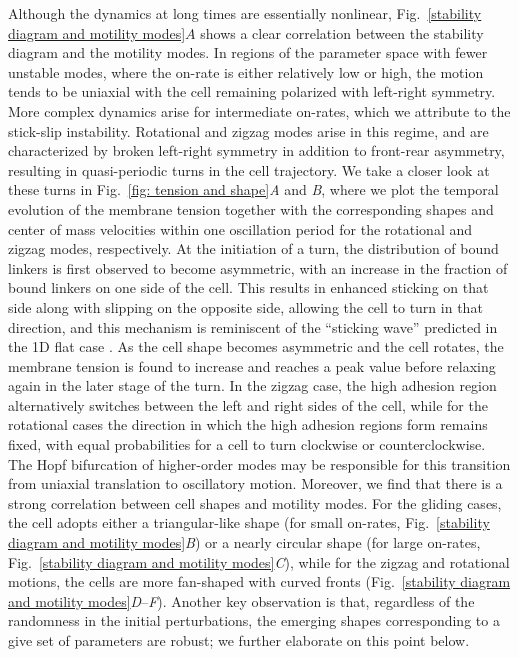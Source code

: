 \documentclass[12pt]{article}
\begin{document}
Although the dynamics at long times are essentially nonlinear, Fig.~\ref{stability diagram and motility modes}$A$ shows a clear correlation between the stability diagram and the motility modes. 
In regions of the parameter space with fewer unstable modes, where the on-rate is either relatively low or high, the motion tends to be uniaxial with the cell remaining polarized with left-right symmetry. 
More complex dynamics arise for intermediate on-rates, which we attribute to the stick-slip instability. 
Rotational and zigzag modes arise in this regime, and are characterized by broken left-right symmetry in addition to front-rear asymmetry, resulting in quasi-periodic turns in the cell trajectory. 
We take a closer look at these turns in Fig.~\ref{fig: tension and shape}\textit{A} and \textit{B}, where we plot the temporal evolution of the membrane tension together with the corresponding shapes and center of mass velocities within one oscillation period for the rotational and zigzag modes, respectively. 
At the initiation of a turn, the distribution of bound linkers is first observed to become asymmetric, with an increase in the fraction of bound linkers on one side of the cell. 
This results in enhanced sticking on that side along with slipping on the opposite side, allowing the cell to turn in that direction, and this mechanism is reminiscent of the ``sticking wave'' predicted in the 1D flat case \cite{sens2020stick}. 
As the cell shape becomes asymmetric and the cell rotates, the membrane tension is found to increase and reaches a peak value before relaxing again in the later stage of the turn. 
In the zigzag case, the high adhesion region alternatively switches between the left and right sides of the cell, while for the rotational cases the direction in which the high adhesion regions form remains fixed, with equal probabilities for a cell to turn clockwise or counterclockwise. The Hopf bifurcation of higher-order modes may be responsible for this transition from uniaxial translation to oscillatory motion. 
Moreover, we find that there is a strong correlation between cell shapes and motility modes. 
For the gliding cases, the cell adopts either a triangular-like shape (for small on-rates, Fig.~\ref{stability diagram and motility modes}\textit{B}) or a nearly circular shape (for large on-rates, Fig.~\ref{stability diagram and motility modes}\textit{C}), while for the zigzag and rotational motions, the cells are more fan-shaped with curved fronts (Fig.~\ref{stability diagram and motility modes}\textit{D}--\textit{F}). 
Another key observation is that, regardless of the randomness in the initial perturbations, the emerging shapes corresponding to a give set of parameters are robust; we further elaborate on this point below.
\end{document}
